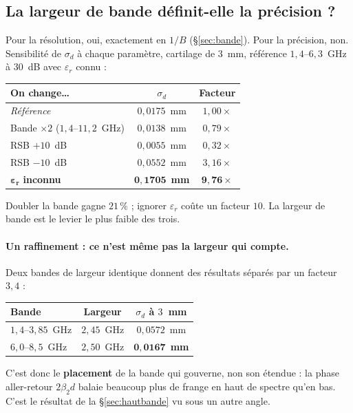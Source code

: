 \documentclass[11pt,a4paper]{article}
\newcommand{\eps}{\varepsilon_r}
\begin{document}
\subsection{La largeur de bande définit-elle la précision ?}

Pour la résolution, oui, exactement en $1/B$ (\S\ref{sec:bande}). Pour la
précision, non. Sensibilité de $\sigma_d$ à chaque paramètre, cartilage de
$3$~mm, référence $1{,}4$--$6{,}3$~GHz à $30$~dB avec $\eps$ connu :

\begin{table}[h]
\centering
\begin{tabular}{lcc}
\toprule
On change\dots & $\sigma_d$ & Facteur \\
\midrule
\emph{Référence} & $0{,}0175$~mm & $1{,}00\times$ \\
Bande $\times 2$ ($1{,}4$--$11{,}2$~GHz) & $0{,}0138$~mm & $0{,}79\times$ \\
RSB $+10$~dB & $0{,}0055$~mm & $0{,}32\times$ \\
RSB $-10$~dB & $0{,}0552$~mm & $3{,}16\times$ \\
$\mathbf{\eps}$ \textbf{inconnu} & $\mathbf{0{,}1705}$~\textbf{mm}
  & $\mathbf{9{,}76\times}$ \\
\bottomrule
\end{tabular}
\end{table}

Doubler la bande gagne $21\,\%$ ; ignorer $\eps$ coûte un facteur $10$. La
largeur de bande est le levier le plus faible des trois.

\paragraph{Un raffinement : ce n'est même pas la largeur qui compte.} Deux
bandes de largeur identique donnent des résultats séparés par un facteur
$3{,}4$ :

\begin{table}[h]
\centering
\begin{tabular}{lcc}
\toprule
Bande & Largeur & $\sigma_d$ à $3$~mm \\
\midrule
$1{,}4$--$3{,}85$~GHz & $2{,}45$~GHz & $0{,}0572$~mm \\
$6{,}0$--$8{,}5$~GHz & $2{,}50$~GHz & $\mathbf{0{,}0167}$~\textbf{mm} \\
\bottomrule
\end{tabular}
\end{table}

C'est donc le \textbf{placement} de la bande qui gouverne, non son étendue :
la phase aller-retour $2\beta_2 d$ balaie beaucoup plus de frange en haut de
spectre qu'en bas. C'est le résultat de la \S\ref{sec:hautbande} vu sous un
autre angle.
\end{document}
